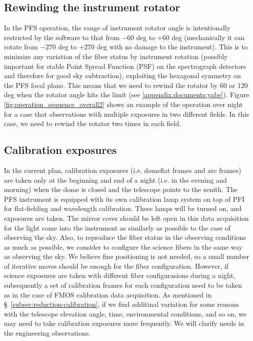 \documentclass[a4paper]{article}
\begin{document}
\subsection{Rewinding the instrument rotator}

In the PFS operation, the range of instrument rotator angle is
intentionally restricted by the software to that from $-60$ deg to
$+60$ deg (mechanically it can rotate from $-270$ deg to $+270$ deg
with no damage to the instrument). This is to minimize any variation
of the fiber status by instrument rotation (possibly important for
stable Point Spread Function (PSF) on the spectrograph detectors and
therefore for good sky subtraction), exploiting the hexagonal symmetry
on the PFS focal plane. This means that we need to rewind the rotator
by 60 or 120 deg when the rotator angle hits the limit (see
\ref{appendix:documents:yabe}). Figure
\ref{fig:operation_sequence_overall2} shows an example of the
operation over night for a case that observations with multiple
exposures in two different fields. In this case, we need to rewind the
rotator two times in each field.

\subsection{Calibration exposures}

In the current plan, calibration exposures (i.e. domeflat frames and
arc frames) are taken only at the beginning and end of a night
(i.e. in the evening and morning) when the dome is closed and the
telescope points to the zenith. The PFS instrument is equipped with
its own calibration lamp system on top of PFI for flat-fielding and
wavelength calibration. These lamps will be turned on, and exposures
are taken. The mirror cover should be left open in this data
acquisition for the light come into the instrument as similarly as
possible to the case of observing the sky. Also, to reproduce the
fiber status in the observing conditions as much as possible, we
consider to configure the science fibers in the same way as observing
the sky. We believe fine positioning is not needed, so a small number
of iterative moves should be enough for the fiber configuration.
However, if science exposures are taken with different fiber
configurasions during a night, subsequently a set of calibration
frames for each configuration need to be taken as in the case of FMOS
calibration data acquisition. As mentioned in
\S~\ref{subsec:reduction-calibration}, if we find additinal variation
for some reasons with the telescope elevation angle, time,
environmental conditions, and so on, we may need to take calibration
exposures more frequently. We will clarify needs in the engineering
observations.
\end{document}
